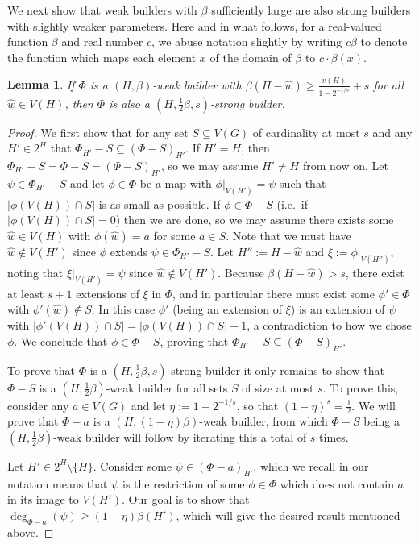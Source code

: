 \documentclass[12pt,letterpaper]{article}
\newtheorem{lemma}[theorem]{Lemma}
\theoremstyle{definition}
\newcommand{\sub}{\subseteq}
\begin{document}
	We next show that weak builders with $\beta$ sufficiently large are also strong builders with slightly weaker parameters.  Here and in what follows, for a real-valued function $\beta$ and real number $c$, we abuse notation slightly by writing $c\beta$ to denote the function which maps each element $x$ of the domain of $\beta$ to $c\cdot \beta(x)$.
	
	\begin{lemma}\label{lemma strong builder}
		If $\Phi$ is a $(H,\beta)$-weak builder with $\beta(H-\hat{w})\geq \frac{v(H)}{1-2^{-1/s}}+s$ for all $\hat{w}\in V(H)$, then $\Phi$ is also a $(H,\frac{1}{2}\beta,s)$-strong builder.
	\end{lemma}
	
	\begin{proof}
		We first show that for any set $S\sub V(G)$ of cardinality at most $s$ and any $H'\in 2^H$ that $\Phi_{H'}-S\subseteq (\Phi-S)_{H'}$.   If $H'=H$, then $\Phi_{H'}-S=\Phi-S=(\Phi-S)_{H'}$, so we may assume $H'\neq H$ from now on.  Let $\psi\in \Phi_{H'}-S$ and let $\phi\in \Phi$ be a map with $\phi|_{V(H')}=\psi$ such that $|\phi(V(H))\cap S|$ is as small as possible.  If $\phi\in \Phi-S$ (i.e.\ if $|\phi(V(H))\cap S|=0$) then we are done, so we may assume there exists some $\hat{w}\in V(H)$ with $\phi(\hat{w})=a$ for some $a\in S$.  Note that we must have $\hat{w}\notin V(H')$ since $\phi$ extends $\psi\in \Phi_{H'}-S$.  Let $H'':=H-\hat{w}$ and $\xi:=\phi|_{V(H'')}$, noting that $\xi|_{V(H')}=\psi$ since $\hat{w}\notin V(H')$.  Because $\beta(H-\hat{w})>s$, there exist at least $s+1$ extensions of $\xi$ in $\Phi$, and in particular there must exist some $\phi'\in \Phi$ with $\phi'(\hat{w})\notin S$.  In this case $\phi'$ (being an extension of $\xi$) is an extension of $\psi$ with $|\phi'(V(H))\cap S|=|\phi(V(H))\cap S|-1$, a contradiction to how we chose $\phi$.  We conclude that $\phi\in \Phi-S$, proving  that $\Phi_{H'}-S\subseteq (\Phi-S)_{H'}$.
		
		To prove that $\Phi$ is a $(H,\frac{1}{2}\beta,s)$-strong builder it only remains to show that $\Phi-S$ is a $(H,\frac{1}{2}\beta)$-weak builder for all sets $S$ of size at most $s$.  To prove this, consider any $a\in V(G)$ and let $\eta:=1-2^{-1/s}$, so that $(1-\eta)^s=\frac{1}{2}$. We will prove that $\Phi-a$ is a $(H,(1-\eta)\beta)$-weak builder, from which $\Phi-S$ being a $(H,\frac{1}{2}\beta)$-weak builder  will follow by iterating this a total of $s$ times.  
		
		Let $H'\in 2^H\setminus\{H\}$. Consider some $\psi\in (\Phi-a)_{H'}$, which we recall in our notation means that $\psi$ is the restriction of some $\phi\in \Phi$ which does not contain $a$ in its image to $V(H')$.  Our goal is to show that $\deg_{\Phi-a}(\psi)\geq (1-\eta) \beta(H')$, which will give the desired result mentioned above.
		

\end{proof}
\end{document}
